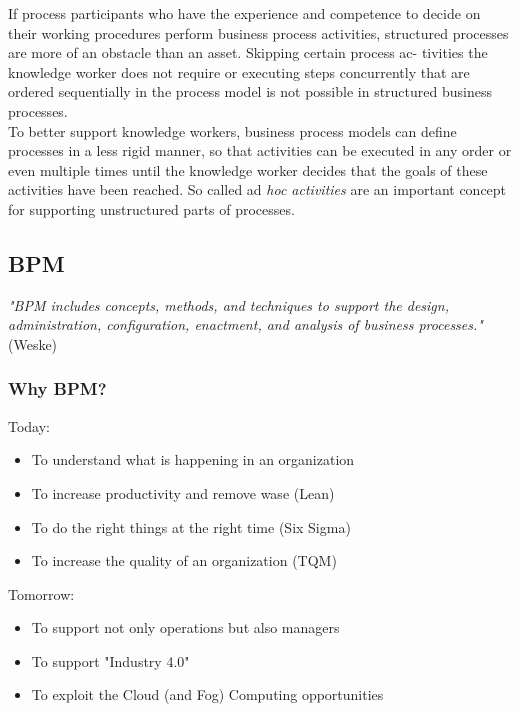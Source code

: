 \documentclass[10pt,a4paper]{article}
\begin{document}
If process participants who have the experience and competence to decide on their working procedures perform business process activities, structured processes are more of an obstacle than an asset. Skipping certain process ac- tivities the knowledge worker does not require or executing steps concurrently that are ordered sequentially in the process model is not possible in structured business processes. \\ 
To better support knowledge workers, business process models can define processes in a less rigid manner, so that activities can be executed in any order or even multiple times until the knowledge worker decides that the goals of these activities have been reached. So called ad \textit{hoc activities} are an important concept for supporting unstructured parts of processes.
\subsection{BPM}
\textit{"BPM includes concepts, methods, and techniques to support the design, administration, configuration, enactment, and analysis of business processes."} (Weske)
\subsubsection{Why BPM?}
Today:
\begin{itemize}
	\item To understand what is happening in an organization
	\item To increase productivity and remove wase (Lean)
	\item To do the right things at the right time (Six Sigma)
	\item To increase the quality of an organization (TQM)
\end{itemize}
Tomorrow:
\begin{itemize}
	\item To support not only operations but also managers
	\item To support "Industry 4.0"
	\item To exploit the Cloud (and Fog) Computing opportunities
\end{itemize}
\end{document}
